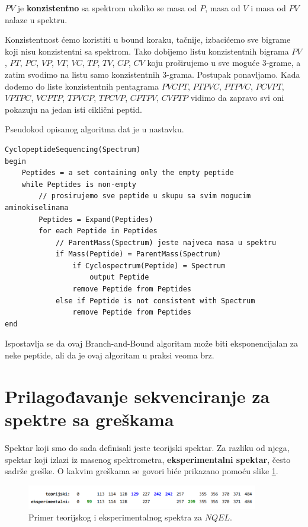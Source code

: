 \begin{definicija}
$PV$ je \textbf{konzistentno} sa spektrom ukoliko se masa od $P$, masa od $V$ i masa od $PV$ nalaze u spektru.
\end{definicija}

\noindent Konzistentnost ćemo koristiti u bound koraku, tačnije, izbacićemo sve bigrame koji nisu konzistentni sa spektrom. Tako dobijemo listu konzistentnih bigrama $PV$, $PT$, $PC$, $VP$, $VT$, $VC$, $TP$, $TV$, $CP$, $CV$ koju proširujemo u sve moguće $3$-grame, a zatim svodimo na listu samo konzistentnih $3$-grama. Postupak ponavljamo. Kada dođemo do liste konzistentnih pentagrama $PVCPT$, $PTPVC$, $PTPVC$, $PCVPT$, $VPTPC$, $VCPTP$, $TPVCP$, $TPCVP$, $CPTPV$, $CVPTP$ vidimo da zapravo svi oni pokazuju na jedan isti ciklični peptid.

Pseudokod opisanog algoritma dat je u nastavku.
\begin{lstlisting}
CyclopeptideSequencing(Spectrum)
begin
	Peptides = a set containing only the empty peptide
	while Peptides is non-empty
		// prosirujemo sve peptide u skupu sa svim mogucim aminokiselinama
		Peptides = Expand(Peptides)
		for each Peptide in Peptides
			// ParentMass(Spectrum) jeste najveca masa u spektru
			if Mass(Peptide) = ParentMass(Spectrum)
				if Cyclospectrum(Peptide) = Spectrum
					output Peptide
				remove Peptide from Peptides
			else if Peptide is not consistent with Spectrum
				remove Peptide from Peptides
end
\end{lstlisting}

Ispostavlja se da ovaj Branch-and-Bound algoritam može biti eksponencijalan za neke peptide, ali da je ovaj algoritam u praksi veoma brz.



\section{Prilagođavanje sekvenciranje za spektre sa greškama}

Spektar koji smo do sada definisali jeste teorijski spektar. Za razliku od njega, spektar koji izlazi iz masenog spektrometra, \textbf{eksperimentalni spektar}, često sadrže greške. O kakvim greškama se govori biće prikazano pomoću slike \ref{slika:ekspSpektar}.

\begin{figure}[h!]
	\centering
	\includegraphics[width=0.9\textwidth]{poglavlja/4/slike/ekspSpektar.png}
	\caption{Primer teorijskog i eksperimentalnog spektra za $NQEL$.}
	\label{slika:ekspSpektar}
\end{figure} 

